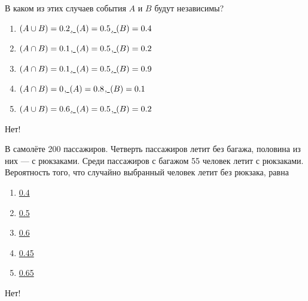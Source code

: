 \documentclass[t]{beamer}
\let\P\relax
\DeclareMathOperator{\P}{\mathbb{P}}
\begin{document}
 \begin{frame} \label{12-No} 
\begin{block}{12} 

В каком из этих случаев события $A$ и $B$ будут независимы?


 \end{block} 
\begin{enumerate} 
\item[] \hyperlink{12-No}{\beamergotobutton{}  $\P(A \cup B) = 0.2$, $\P (A) = 0.5$, $\P(B) = 0.4$ }
\item[] \hyperlink{12-Yes}{\beamergotobutton{}  $\P(A \cap B) = 0.1$, $\P (A) = 0.5$, $\P(B) = 0.2$ }
\item[] \hyperlink{12-No}{\beamergotobutton{}  $\P(A \cap B) = 0.1$, $\P (A) = 0.5$, $\P(B) = 0.9$ }
\item[] \hyperlink{12-No}{\beamergotobutton{}  $\P(A \cap B) = 0$, $\P (A) = 0.8$, $\P(B) = 0.1$ }
\item[] \hyperlink{12-No}{\beamergotobutton{}  $\P(A \cup B) = 0.6$, $\P (A) = 0.5$, $\P(B) = 0.2$ }
\end{enumerate} 

 \alert{Нет!} 
\end{frame} 


 \begin{frame} \label{13-No} 
\begin{block}{13} 

В самолёте 200 пассажиров. Четверть пассажиров летит без багажа, половина из них — с рюкзаками. Среди пассажиров с багажом 55 человек летит с рюкзаками. Вероятность того, что случайно выбранный человек летит без рюкзака, равна

  


 \end{block} 
\begin{enumerate} 
\item[] \hyperlink{13-No}{\beamergotobutton{}  0.4 }
\item[] \hyperlink{13-No}{\beamergotobutton{}  0.5 }
\item[] \hyperlink{13-Yes}{\beamergotobutton{}  0.6 }
\item[] \hyperlink{13-No}{\beamergotobutton{}  0.45 }
\item[] \hyperlink{13-No}{\beamergotobutton{}  0.65 }
\end{enumerate} 

 \alert{Нет!} 
\end{frame} 
\end{document}

